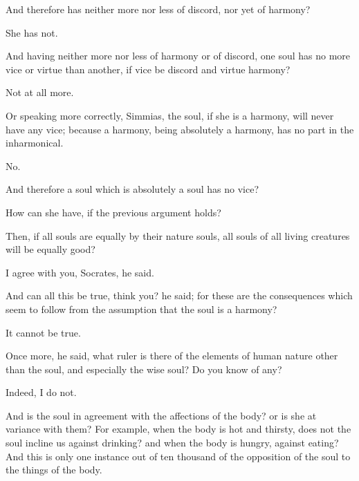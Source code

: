 \documentclass[11pt,letter]{article}
\begin{document}
\par  And therefore has neither more nor less of discord, nor yet of harmony?

\par  She has not.

\par  And having neither more nor less of harmony or of discord, one soul has no more vice or virtue than another, if vice be discord and virtue harmony?

\par  Not at all more.

\par  Or speaking more correctly, Simmias, the soul, if she is a harmony, will never have any vice; because a harmony, being absolutely a harmony, has no part in the inharmonical.

\par  No.

\par  And therefore a soul which is absolutely a soul has no vice?

\par  How can she have, if the previous argument holds?

\par  Then, if all souls are equally by their nature souls, all souls of all living creatures will be equally good?

\par  I agree with you, Socrates, he said.

\par  And can all this be true, think you? he said; for these are the consequences which seem to follow from the assumption that the soul is a harmony?

\par  It cannot be true.

\par  Once more, he said, what ruler is there of the elements of human nature other than the soul, and especially the wise soul? Do you know of any?

\par  Indeed, I do not.

\par  And is the soul in agreement with the affections of the body? or is she at variance with them? For example, when the body is hot and thirsty, does not the soul incline us against drinking? and when the body is hungry, against eating? And this is only one instance out of ten thousand of the opposition of the soul to the things of the body.
\end{document}
